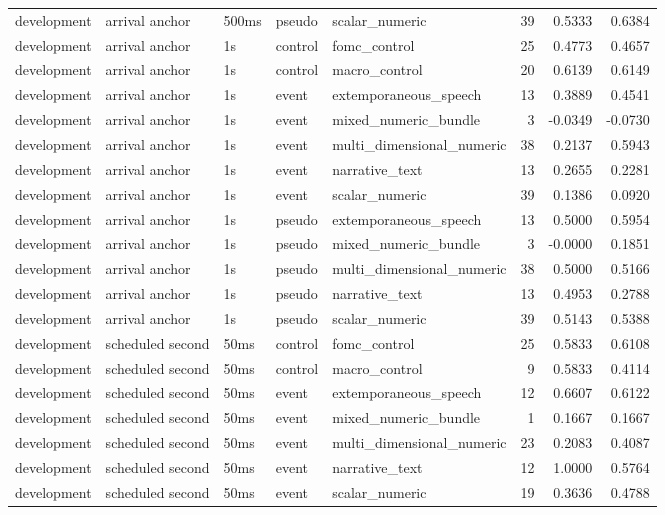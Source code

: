 \begin{tabular}{lllllrrr}
development & arrival anchor & 500ms & pseudo & scalar_numeric & 39 & 0.5333 & 0.6384 \\
development & arrival anchor & 1s & control & fomc_control & 25 & 0.4773 & 0.4657 \\
development & arrival anchor & 1s & control & macro_control & 20 & 0.6139 & 0.6149 \\
development & arrival anchor & 1s & event & extemporaneous_speech & 13 & 0.3889 & 0.4541 \\
development & arrival anchor & 1s & event & mixed_numeric_bundle & 3 & -0.0349 & -0.0730 \\
development & arrival anchor & 1s & event & multi_dimensional_numeric & 38 & 0.2137 & 0.5943 \\
development & arrival anchor & 1s & event & narrative_text & 13 & 0.2655 & 0.2281 \\
development & arrival anchor & 1s & event & scalar_numeric & 39 & 0.1386 & 0.0920 \\
development & arrival anchor & 1s & pseudo & extemporaneous_speech & 13 & 0.5000 & 0.5954 \\
development & arrival anchor & 1s & pseudo & mixed_numeric_bundle & 3 & -0.0000 & 0.1851 \\
development & arrival anchor & 1s & pseudo & multi_dimensional_numeric & 38 & 0.5000 & 0.5166 \\
development & arrival anchor & 1s & pseudo & narrative_text & 13 & 0.4953 & 0.2788 \\
development & arrival anchor & 1s & pseudo & scalar_numeric & 39 & 0.5143 & 0.5388 \\
development & scheduled second & 50ms & control & fomc_control & 25 & 0.5833 & 0.6108 \\
development & scheduled second & 50ms & control & macro_control & 9 & 0.5833 & 0.4114 \\
development & scheduled second & 50ms & event & extemporaneous_speech & 12 & 0.6607 & 0.6122 \\
development & scheduled second & 50ms & event & mixed_numeric_bundle & 1 & 0.1667 & 0.1667 \\
development & scheduled second & 50ms & event & multi_dimensional_numeric & 23 & 0.2083 & 0.4087 \\
development & scheduled second & 50ms & event & narrative_text & 12 & 1.0000 & 0.5764 \\
development & scheduled second & 50ms & event & scalar_numeric & 19 & 0.3636 & 0.4788 \\

\end{tabular}
